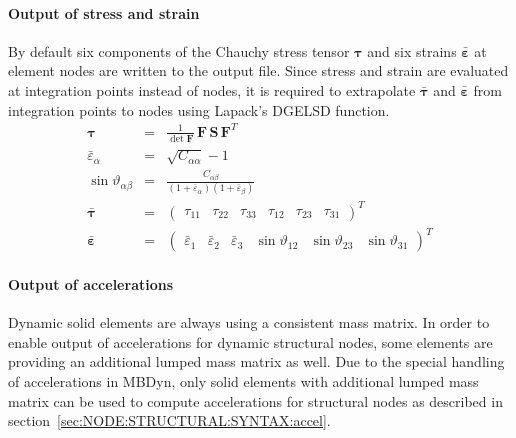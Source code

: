 \paragraph{Output of stress and strain}
By default six components of the Chauchy stress tensor $\boldsymbol{\tau}$ and six strains $\bar{\boldsymbol{\varepsilon}}$ at element nodes are written to the output file.
Since stress and strain are evaluated at integration points instead of nodes, it is required to extrapolate $\bar{\boldsymbol{\tau}}$ and $\bar{\boldsymbol{\varepsilon}}$
from integration points to nodes using Lapack's DGELSD function.
\begin{eqnarray}
  \boldsymbol{\tau} & = & \frac{1}{\det{\boldsymbol{F}}} \, \boldsymbol{F} \, \boldsymbol{S} \, \boldsymbol{F}^T \\
  \bar{\varepsilon}_{\alpha} & = & \sqrt{C_{\alpha\alpha}} - 1 \\
  \sin{\vartheta_{\alpha\beta}} & = & \frac{C_{\alpha\beta}}{\left(1 + \bar{\varepsilon}_{\alpha}\right)\left(1 + \bar{\varepsilon}_{\beta}\right)} \\
  \bar{\boldsymbol{\tau}} & = & \begin{pmatrix}
    \tau_{11} &
    \tau_{22} &
    \tau_{33} &
    \tau_{12} &
    \tau_{23} &
    \tau_{31}
  \end{pmatrix}^T \\
  \bar{\boldsymbol{\varepsilon}} & = & \begin{pmatrix}
    \bar{\varepsilon}_1 &
    \bar{\varepsilon}_2 &
    \bar{\varepsilon}_3 &
    \sin{\vartheta}_{12} &
    \sin{\vartheta}_{23} &
    \sin{\vartheta}_{31}
  \end{pmatrix}^T
\end{eqnarray}

\paragraph{Output of accelerations}
Dynamic solid elements are always using a consistent mass matrix. In order to enable output of accelerations
for dynamic structural nodes, some elements are providing an additional lumped mass matrix as well.
Due to the special handling of accelerations in MBDyn, only solid elements with additional lumped mass matrix
can be used to compute accelerations for structural nodes as described in section~\ref{sec:NODE:STRUCTURAL:SYNTAX:accel}.

